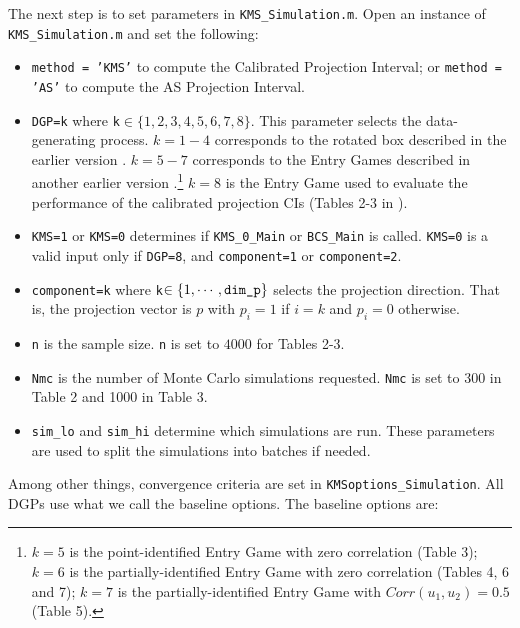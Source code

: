 \documentclass[12pt]{article}
\def\code#1{\texttt{#1}}
\begin{document}
The next step is to set parameters in \code{KMS\_Simulation.m}.  Open an instance of \code{KMS\_Simul\-ation.m} and set the following:
\begin{itemize}
\item \code{method = 'KMS'} to compute the Calibrated Projection Interval; or \code{method = 'AS'} to compute the AS Projection Interval.
\item \code{DGP=k} where \code{k}$\in \{1,2,3,4,5,6,7,8\}$. This parameter selects the data-generating process.  $k=1-4$ corresponds to the rotated box described in the earlier version . $k=5-7$ corresponds to the Entry Games described in another earlier version \cite{kaido2017confidence}.\footnote{$k=5$ is the point-identified Entry Game with zero correlation (Table 3); $k=6$ is the partially-identified Entry Game with zero correlation (Tables 4, 6 and 7); $k=7$ is the partially-identified Entry Game with $Corr(u_1,u_2) = 0.5$ (Table 5).}    $k=8$ is the Entry Game used to evaluate the performance of the calibrated projection CIs (Tables 2-3 in ).
\item \code{KMS=1} or \code{KMS=0} determines if \code{KMS\_0\_Main} or \code{BCS\_Main} is called. \code{KMS=0} is a valid input only if \code{DGP=8}, and  \code{component=1} or \code{component=2}.
\item \code{component=k} where \code{k}$\in \{1,\cdots,\text{\code{dim\_p}}\}$ selects the projection direction.  That is, the projection vector is $p$ with $p_i = 1$ if $i=k$ and $p_i = 0$ otherwise.
\item \code{n} is the sample size.  \code{n} is set to $4000$ for Tables 2-3.
\item \code{Nmc} is the number of Monte Carlo simulations requested.  \code{Nmc} is set to 300 in Table 2 and 1000 in Table 3.
\item \code{sim\_lo} and \code{sim\_hi} determine which simulations are run.  These parameters are used to split the simulations into batches if needed.
\end{itemize}
 Among other things, convergence criteria  are set in \code{KMSoptions\_Simulation}.  All DGPs use what we call the baseline options.  %
The baseline options are:
\end{document}
